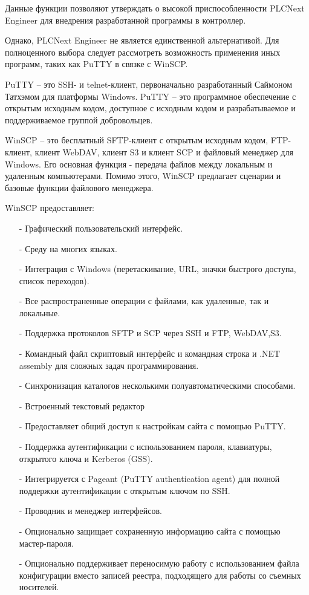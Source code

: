 Данные функции позволяют утверждать о высокой приспособленности PLCNext Engineer для внедрения разработанной программы в контроллер.

Однако, PLCNext Engineer не является единственной альтернативой. Для полноценного выбора следует рассмотреть возможность применения иных программ, таких как PuTTY в связке с WinSCP.

PuTTY {--} это SSH- и telnet-клиент, первоначально разработанный Саймоном Татхэмом для платформы Windows. PuTTY {--} это программное обеспечение с открытым исходным кодом, доступное с исходным кодом и разрабатываемое и поддерживаемое группой добровольцев.

WinSCP {--} это бесплатный SFTP-клиент с открытым исходным кодом, FTP-клиент, клиент WebDAV, клиент S3 и клиент SCP и файловый менеджер для Windows. Его основная функция - передача файлов между локальным и удаленным компьютерами. Помимо этого, WinSCP предлагает сценарии и базовые функции файлового менеджера.

WinSCP предоставляет:

\begin{itemize}
    \item[-] Графический пользовательский интерфейс.  
    \item[-] Среду на многих языках.
    \item[-] Интеграция с Windows (перетаскивание, URL, значки быстрого доступа, список переходов). 
    \item[-] Все распространенные операции с файлами, как удаленные, так и локальные.  
    \item[-] Поддержка протоколов SFTP и SCP через SSH и FTP, WebDAV,S3. 
    \item[-]  Командный файл скриптовый интерфейс и командная строка и .NET assembly для сложных задач программирования.
    \item[-] Синхронизация каталогов несколькими полуавтоматическими способами.
    \item[-] Встроенный текстовый редактор
    \item[-] Предоставляет общий доступ к настройкам сайта с помощью PuTTY.
    \item[-] Поддержка аутентификации с использованием пароля, клавиатуры, открытого ключа и Kerberos (GSS). 
    \item[-] Интегрируется с Pageant (PuTTY authentication agent) для полной поддержки аутентификации с открытым ключом по SSH.
    \item[-] Проводник и менеджер интерфейсов. 
    \item[-] Опционально защищает сохраненную информацию сайта с помощью мастер-пароля.
    \item[-] Опционально поддерживает переносимую работу с использованием файла конфигурации вместо записей реестра, подходящего для работы со съемных носителей.
\end{itemize}

